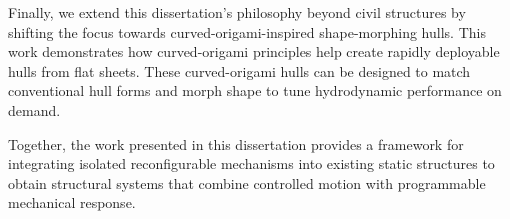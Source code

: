Finally, we extend this dissertation's philosophy beyond civil structures by shifting the focus towards curved-origami-inspired shape-morphing hulls. This work demonstrates how curved-origami principles help create rapidly deployable hulls from flat sheets. These curved-origami hulls can be designed to match conventional hull forms and morph shape to tune hydrodynamic performance on demand.

Together, the work presented in this dissertation provides a framework for integrating isolated reconfigurable mechanisms into existing static structures to obtain structural systems that combine controlled motion with programmable mechanical response.